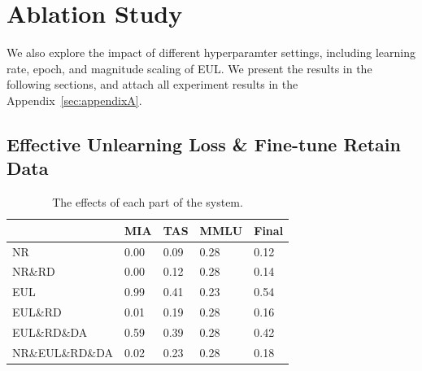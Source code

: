 \documentclass[11pt]{article}
\begin{document}


\section{Ablation Study}
\label{sec:Ablation}


We also explore the impact of different hyperparamter settings, including learning rate, epoch, and magnitude scaling of EUL. We present the results in the following sections, and attach all experiment results in the Appendix~\ref{sec:appendixA}.
\iffalse
\subsection{Effective Unlearning Loss \& Fine-tune Retain Data} 

\begin{table}[h]\footnotesize
  \centering
    \begin{tabular}{l|l|l|l|l}
    \hline
        ~ & MIA & TAS & MMLU & Final \\ \hline
        NR & 0.00 & 0.09 & 0.28 & 0.12 \\ \hline
        NR\&RD & 0.00 & 0.12 & 0.28 & 0.14 \\ \hline
        EUL & 0.99 & 0.41 & 0.23 & 0.54 \\ \hline
        EUL\&RD & 0.01 & 0.19 & 0.28 & 0.16 \\ \hline
        EUL\&RD\&DA & 0.59 & 0.39 & 0.28 & 0.42 \\ \hline
        NR\&EUL\&RD\&DA & 0.02 & 0.23 & 0.28 & 0.18 \\ \hline
    \end{tabular}
  \caption{The effects of each part of the system.}
  \label{tab:accents}
\end{table}
\end{document}

